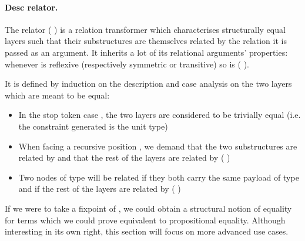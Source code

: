 \begin{agdasnippet}
\end{agdasnippet}

\paragraph{Desc relator.}
The relator (  ) is a relation transformer which characterises
structurally equal layers such that their substructures are themselves related
by the relation it is passed as an argument. It inherits a lot of its relational
arguments' properties: whenever  is reflexive (respectively symmetric or
transitive) so is {(   )}.\label{lem:zipstable}

It is defined by induction on the description and case analysis on the two
layers which are meant to be equal:
\begin{itemize}
  \item In the stop token case  , the two layers are considered to
    be trivially equal (i.e. the constraint generated is the unit type)
  \item When facing a recursive position { \AB{$\Delta$}  }, we
    demand that the two substructures are related by { \AB{$\Delta$} }
    and that the rest of the layers are related by (   )
  \item Two nodes of type {  } will
    be related if they both carry the same payload  of type  and if
    the rest of the layers are related by (    )
\end{itemize}

\begin{agdasnippet}
\end{agdasnippet}

If we were to take a fixpoint of , we could obtain a structural
notion of equality for terms which we could prove equivalent to propositional
equality. Although interesting in its own right, this section will focus
on more advanced use cases.



